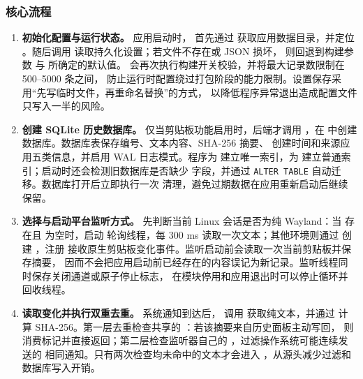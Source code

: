 \documentclass[12pt,a4paper]{ctexart}
\begin{document}
\subsubsection{核心流程}

\begin{sloppypar}
\begin{enumerate}[label=(\arabic*)]
  \item \textbf{初始化配置与运行状态。}
    应用启动时， 首先通过 
    获取应用数据目录，并定位 。随后调用
     读取持久化设置；若文件不存在或 JSON 损坏，
    则回退到构建参数  与  所确定的默认值。
     会再次执行构建开关校验，并将最大记录数限制在 500--5000 条之间，
    防止运行时配置绕过打包阶段的能力限制。设置保存采用“先写临时文件，再重命名替换”的方式，
    以降低程序异常退出造成配置文件只写入一半的风险。

  \item \textbf{创建 SQLite 历史数据库。}
    仅当剪贴板功能启用时，后端才调用 ，在
     中创建数据库。数据库表保存编号、文本内容、SHA-256 摘要、
    创建时间和来源应用五类信息，并启用 WAL 日志模式。程序为 
    建立唯一索引，为  建立普通索引；启动时还会检测旧数据库是否缺少
     字段，并通过 \texttt{ALTER TABLE} 自动迁移。数据库打开后立即执行一次
    清理，避免过期数据在应用重新启动后继续保留。

  \item \textbf{选择与启动平台监听方式。}
     先判断当前 Linux 会话是否为纯 Wayland：当
     存在且  为空时，启动
     轮询线程，每 300 ms 读取一次文本；其他环境则通过
     创建 ，注册
     接收原生剪贴板变化事件。监听启动前会读取一次当前剪贴板并保存摘要，
    因而不会把应用启动前已经存在的内容误记为新记录。监听线程同时保存关闭通道或原子停止标志，
    在模块停用和应用退出时可以停止循环并  回收线程。

  \item \textbf{读取变化并执行双重去重。}
    系统通知到达后， 调用
     获取纯文本，并通过 
    计算 SHA-256。第一层去重检查共享的 ：若该摘要来自历史面板主动写回，
    则消费标记并直接返回；第二层检查监听器自己的 ，过滤操作系统可能连续发送的
    相同通知。只有两次检查均未命中的文本才会进入 ，从源头减少过滤和数据库写入开销。


\end{enumerate}
\end{sloppypar}
\end{document}
